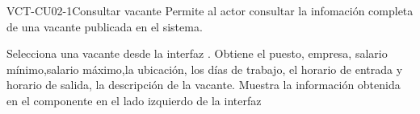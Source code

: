 \begin{UseCase}[]{VCT-CU02-1}{Consultar vacante}{
	Permite al actor consultar la infomación completa de una vacante publicada en el sistema.
}
\end{UseCase}

\begin{UCtrayectoria}
	\UCpaso [\UCactor] Selecciona una vacante desde la interfaz .
	\UCpaso [\UCsist] Obtiene el puesto, empresa, salario mínimo,salario máximo,la ubicación,
	los días de trabajo, el horario de entrada y horario de salida, la descripción  de la vacante.
	\UCpaso [\UCsist] Muestra la información obtenida en el componente  en el lado izquierdo de la interfaz 
\end{UCtrayectoria}

